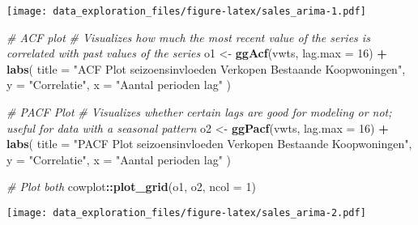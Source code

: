 \documentclass[
]{article}
\newenvironment{Shaded}{\begin{snugshade}}{\end{snugshade}}
\newcommand{\CommentTok}[1]{\textcolor[rgb]{0.56,0.35,0.01}{\textit{#1}}}
\newcommand{\DataTypeTok}[1]{\textcolor[rgb]{0.13,0.29,0.53}{#1}}
\newcommand{\DecValTok}[1]{\textcolor[rgb]{0.00,0.00,0.81}{#1}}
\newcommand{\KeywordTok}[1]{\textcolor[rgb]{0.13,0.29,0.53}{\textbf{#1}}}
\newcommand{\NormalTok}[1]{#1}
\newcommand{\OperatorTok}[1]{\textcolor[rgb]{0.81,0.36,0.00}{\textbf{#1}}}
\newcommand{\StringTok}[1]{\textcolor[rgb]{0.31,0.60,0.02}{#1}}
\begin{document}
\texttt{[image: data\_exploration\_files/figure-latex/sales\_arima-1.pdf]}

\begin{Shaded}
\begin{Highlighting}[]
\CommentTok{# ACF plot}
\CommentTok{# Visualizes how much the most recent value of the series is correlated with past values of the series}
\NormalTok{o1 <-}\StringTok{ }\KeywordTok{ggAcf}\NormalTok{(vwts, }\DataTypeTok{lag.max =} \DecValTok{16}\NormalTok{) }\OperatorTok{+}
\StringTok{  }\KeywordTok{labs}\NormalTok{(}
    \DataTypeTok{title =} \StringTok{"ACF Plot seizoensinvloeden Verkopen Bestaande Koopwoningen"}\NormalTok{,}
    \DataTypeTok{y =} \StringTok{"Correlatie"}\NormalTok{,}
    \DataTypeTok{x =} \StringTok{"Aantal perioden lag"}
\NormalTok{    ) }

\CommentTok{# PACF Plot}
\CommentTok{# Visualizes whether certain lags are good for modeling or not; useful for data with a seasonal pattern}
\NormalTok{o2 <-}\StringTok{ }\KeywordTok{ggPacf}\NormalTok{(vwts, }\DataTypeTok{lag.max =} \DecValTok{16}\NormalTok{) }\OperatorTok{+}
\StringTok{  }\KeywordTok{labs}\NormalTok{(}
    \DataTypeTok{title =} \StringTok{"PACF Plot seizoensinvloeden Verkopen Bestaande Koopwoningen"}\NormalTok{,}
    \DataTypeTok{y =} \StringTok{"Correlatie"}\NormalTok{,}
    \DataTypeTok{x =} \StringTok{"Aantal perioden lag"}
\NormalTok{    ) }

\CommentTok{# Plot both}
\NormalTok{cowplot}\OperatorTok{::}\KeywordTok{plot_grid}\NormalTok{(o1, o2, }\DataTypeTok{ncol =} \DecValTok{1}\NormalTok{)}
\end{Highlighting}
\end{Shaded}

\texttt{[image: data\_exploration\_files/figure-latex/sales\_arima-2.pdf]}

\begin{Shaded}
\end{Shaded}
\end{document}
